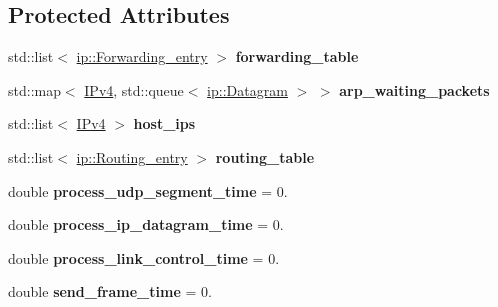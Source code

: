 \subsection*{Protected Attributes}
\begin{DoxyCompactItemize}
\item 
std\+::list$<$ \hyperlink{structip_1_1Forwarding__entry}{ip\+::\+Forwarding\+\_\+entry} $>$ {\bfseries forwarding\+\_\+table}\hypertarget{classip__protocol_aaeb5d99cd92641500f0013e3822d56a1}{}\label{classip__protocol_aaeb5d99cd92641500f0013e3822d56a1}

\item 
std\+::map$<$ \hyperlink{structIPv4}{I\+Pv4}, std\+::queue$<$ \hyperlink{structip_1_1Datagram}{ip\+::\+Datagram} $>$ $>$ {\bfseries arp\+\_\+waiting\+\_\+packets}\hypertarget{classip__protocol_a284258e9e9050ae7e51b3864f5a953ce}{}\label{classip__protocol_a284258e9e9050ae7e51b3864f5a953ce}

\item 
std\+::list$<$ \hyperlink{structIPv4}{I\+Pv4} $>$ {\bfseries host\+\_\+ips}\hypertarget{classip__protocol_aa7d9cb9aba71a12d55cbb48ebb8023bf}{}\label{classip__protocol_aa7d9cb9aba71a12d55cbb48ebb8023bf}

\item 
std\+::list$<$ \hyperlink{structip_1_1Routing__entry}{ip\+::\+Routing\+\_\+entry} $>$ {\bfseries routing\+\_\+table}\hypertarget{classip__protocol_a10115583b02359dd2a5670d1ad15f491}{}\label{classip__protocol_a10115583b02359dd2a5670d1ad15f491}

\item 
double {\bfseries process\+\_\+udp\+\_\+segment\+\_\+time} = 0.\hypertarget{classip__protocol_a70dbab92c8f81ef06fd54f3e8d7bd948}{}\label{classip__protocol_a70dbab92c8f81ef06fd54f3e8d7bd948}

\item 
double {\bfseries process\+\_\+ip\+\_\+datagram\+\_\+time} = 0.\hypertarget{classip__protocol_a5a4799b4959601058134ada5e68535d9}{}\label{classip__protocol_a5a4799b4959601058134ada5e68535d9}

\item 
double {\bfseries process\+\_\+link\+\_\+control\+\_\+time} = 0.\hypertarget{classip__protocol_a5d8f0b585621473601c220ad283a825f}{}\label{classip__protocol_a5d8f0b585621473601c220ad283a825f}

\item 
double {\bfseries send\+\_\+frame\+\_\+time} = 0.\hypertarget{classip__protocol_a228a55f7b2c25fa8e3900893ccc87e41}{}\label{classip__protocol_a228a55f7b2c25fa8e3900893ccc87e41}

\end{DoxyCompactItemize}


